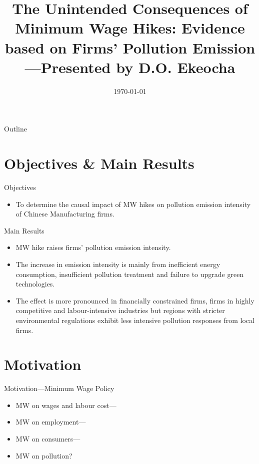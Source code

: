 \documentclass[aspectratio = 169]{beamer}
\title[]{The Unintended Consequences of Minimum Wage Hikes: Evidence based on Firms' Pollution Emission---Presented by D.O. Ekeocha}
\date{\today}
\begin{document}
    \maketitle

    \begin{frame}{Outline}
        \tableofcontents
    \end{frame}


    \section{Objectives \& Main Results}\label{sec:objectives-and-main-results}
    \begin{frame}{Objectives}
        \begin{itemize}
            \item To determine the causal impact of MW hikes on pollution emission intensity of Chinese Manufacturing firms.
        \end{itemize}
    \end{frame}

    \begin{frame}{Main Results}
        \begin{itemize}
            \item MW hike raises firms' pollution emission intensity.
            \item The increase in emission intensity is mainly from inefficient energy consumption, insufficient pollution treatment and failure to upgrade green technologies.
            \item The effect is more pronounced in financially constrained firms, firms in highly competitive and labour-intensive industries but regions with stricter
            environmental regulations exhibit less intensive pollution responses from local firms.
        \end{itemize}
    \end{frame}


    \section{Motivation}\label{sec:motivation}
    \begin{frame}{Motivation---Minimum Wage Policy}
        \begin{itemize}
            \item MW on wages and labour cost---\parencite{coviello2022minimum, alexandre2022minimum}
            \item MW on employment---\parencite{brown1999minimum, neumark1992employment, card2000minimum, cengiz2019effect, dustmann2022reallocation}
            \item MW on consumers---\parencite{harasztosi2019pays}
            \item MW on pollution?
        \end{itemize}
    \end{frame}
\end{document}
